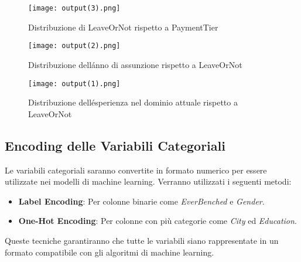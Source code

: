 \documentclass[a4paper,12pt]{article}
\begin{document}
\begin{figure}[H]
    \centering
    \texttt{[image: output(3).png]}
    \caption{Distribuzione di LeaveOrNot rispetto a PaymentTier}
    \label{fig:payment_tier_vs_leave}
\end{figure}

\begin{figure}[H]
    \centering
    \texttt{[image: output(2).png]}
    \caption{Distribuzione dell\'anno di assunzione rispetto a LeaveOrNot}
    \label{fig:joining_year_vs_leave}
\end{figure}

\begin{figure}[H]
    \centering
    \texttt{[image: output(1).png]}
    \caption{Distribuzione dell\'esperienza nel dominio attuale rispetto a LeaveOrNot}
    \label{fig:experience_vs_leave}
\end{figure}


\subsection{Encoding delle Variabili Categoriali}
Le variabili categoriali saranno convertite in formato numerico per essere utilizzate nei modelli di machine learning. Verranno utilizzati i seguenti metodi:
\begin{itemize}
    \item \textbf{Label Encoding}: Per colonne binarie come \textit{EverBenched} e \textit{Gender}.
    \item \textbf{One-Hot Encoding}: Per colonne con più categorie come \textit{City} ed \textit{Education}.
\end{itemize}

Queste tecniche garantiranno che tutte le variabili siano rappresentate in un formato compatibile con gli algoritmi di machine learning.
\end{document}
